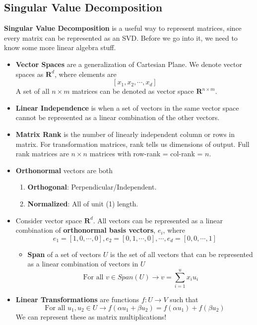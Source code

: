 \documentclass{article}
\begin{document}
\subsection{Singular Value Decomposition}
\textbf{Singular Value Decomposition} is a useful way to represent matrices, since every matrix can be represented as an SVD. Before we go into it, we need to know some more linear algebra stuff.
\begin{itemize}
    \item \textbf{Vector Spaces} are a generalization of Cartesian Plane. We denote vector spaces as $\mathbf{R}^d$, where elements are 
    $$[x_1,x_2,\cdots,x_d]$$
    A set of all $n\times m$ matrices can be denoted as vector space $\mathbf{R}^{n\times m}$.
    
    \item \textbf{Linear Independence} is when a set of vectors in the same vector space cannot be represented as a linear combination of the other vectors.
    
    \item \textbf{Matrix Rank} is the number of linearly independent column or rows in matrix. For transformation matrices, rank tells us dimensions of output. Full rank matrices are $n\times n$ matrices with row-rank = col-rank = $n$.
        
    \item \textbf{Orthonormal} vectors are both 
    \begin{enumerate}
        \item \textbf{Orthogonal}: Perpendicular/Independent.
        \item \textbf{Normalized}: All of unit (1) length.
    \end{enumerate} 
    
    \item Consider vector space $\mathbf{R}^d$. All vectors can be represented as a linear combination of \textbf{orthonormal basis vectors}, $e_i$, where 
    $$e_1 = [1,0,\cdots,0], e_2 = [0,1,\cdots,0], \cdots, e_d = [0,0,\cdots,1]$$
    \begin{itemize}
        \item \textbf{Span} of a set of vectors $U$ is the set of all vectors that can be represented as a linear combination of vectors in $U$
        $$\text{For all } v \in Span(U) \rightarrow v = \sum^u_{i=1}x_iu_i $$
    \end{itemize}

    \item \textbf{Linear Transformations} are functions $f:U\rightarrow V$ such that 
    $$\text{For all }u_1,u_2 \in U \rightarrow f(\alpha u_1 + \beta u_2) = f(\alpha u_1) + f(\beta u_2)$$
    We can represent these as matrix multiplications!
    

\end{itemize}
\end{document}
